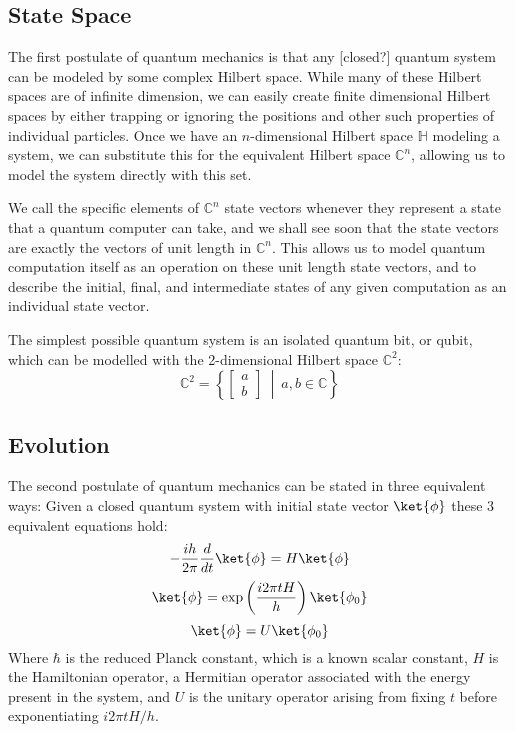 \subsection{State Space}
The first postulate of quantum mechanics is that any [closed?] quantum system can be modeled by some complex Hilbert space. While many of these Hilbert spaces are of infinite dimension, we can easily create finite dimensional Hilbert spaces by either trapping or ignoring the positions and other such properties of individual particles. Once we have an $n$-dimensional Hilbert space $\mathbb{H}$ modeling a system, we can substitute this for the equivalent Hilbert space $\mathbb{C}^n$, allowing us to model the system directly with this set.

We call the specific elements of $\mathbb{C}^n$ state vectors whenever they represent a state that a quantum computer can take, and we shall see soon that the state vectors are exactly the vectors of unit length in $\mathbb{C}^n$. This allows us to model quantum computation itself as an operation on these unit length state vectors, and to describe the initial, final, and intermediate states of any given computation as an individual state vector.

The simplest possible quantum system is an isolated quantum bit, or qubit, which can be modelled with the 2-dimensional Hilbert space $\mathbb{C}^2$:
\[
\mathbb{C}^2 = \left\{\left[\begin{matrix}
a\\
b
\end{matrix}\right]\ \middle|\ a, b \in \mathbb{C}\right\}
\]
\subsection{Evolution}
The second postulate of quantum mechanics can be stated in three equivalent ways: Given a closed quantum system with initial state vector $\ket{\phi}$ these 3 equivalent equations hold:
\[-\frac{ih}{2\pi}\frac{d}{dt}\ket{\phi} = H\ket{\phi}\]
\[\ket{\phi} = \exp\left(\frac{i 2\pi tH}{h}\right)\ket{\phi_0}\]
\[\ket{\phi} = U\ket{\phi_0}\]
Where $\hbar$ is the reduced Planck constant, which is a known scalar constant, $H$ is the Hamiltonian operator, a Hermitian operator associated with the energy present in the system, and $U$ is the unitary operator arising from fixing $t$ before exponentiating $i2\pi tH/h$.

